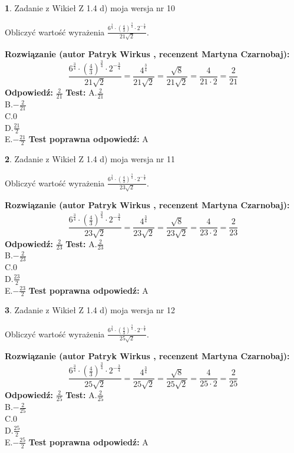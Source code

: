 \documentclass[12pt, a4paper]{article}
\theoremstyle{definition} %
\newtheorem{zad}{}
\newcommand{\zadStart}[1]{\begin{zad}#1\newline}
\newcommand{\zadStop}{\end{zad}}
\newcommand{\rozwStart}[2]{\noindent \textbf{Rozwiązanie (autor #1 , recenzent #2): }\newline}
\newcommand{\rozwStop}{\newline}
\newcommand{\odpStart}{\noindent \textbf{Odpowiedź:}\newline}
\newcommand{\odpStop}{\newline}
\newcommand{\testStart}{\noindent \textbf{Test:}\newline}
\newcommand{\testStop}{\newline}
\newcommand{\kluczStart}{\noindent \textbf{Test poprawna odpowiedź:}\newline}
\newcommand{\kluczStop}{\newline}
\begin{document}
\zadStart{Zadanie z Wikieł Z 1.4 d) moja wersja nr 10}

Obliczyć wartość wyrażenia $\frac{6^{\frac{3}{4}}\cdot (\frac{4}{3})^{\frac{3}{4}}\cdot 2^{-\frac{3}{4}}}{21\sqrt{2}}$.
\zadStop
\rozwStart{Patryk Wirkus}{Martyna Czarnobaj}
$$\frac{6^{\frac{3}{4}}\cdot (\frac{4}{3})^{\frac{3}{4}}\cdot 2^{-\frac{3}{4}}}{21\sqrt{2}} = \frac{4^{\frac{3}{4}}}{21\sqrt{2}} = \frac{\sqrt{8}}{21\sqrt{2}} = \frac{4}{21\cdot 2} = \frac{2}{21}$$
\rozwStop
\odpStart
$\frac{2}{21}$
\odpStop
\testStart
A.$\frac{2}{21}$\\ B.$-\frac{2}{21}$\\ C.$0$\\ D.$\frac{21}{2}$\\ E.$-\frac{21}{2}$
\testStop
\kluczStart
A
\kluczStop



\zadStart{Zadanie z Wikieł Z 1.4 d) moja wersja nr 11}

Obliczyć wartość wyrażenia $\frac{6^{\frac{3}{4}}\cdot (\frac{4}{3})^{\frac{3}{4}}\cdot 2^{-\frac{3}{4}}}{23\sqrt{2}}$.
\zadStop
\rozwStart{Patryk Wirkus}{Martyna Czarnobaj}
$$\frac{6^{\frac{3}{4}}\cdot (\frac{4}{3})^{\frac{3}{4}}\cdot 2^{-\frac{3}{4}}}{23\sqrt{2}} = \frac{4^{\frac{3}{4}}}{23\sqrt{2}} = \frac{\sqrt{8}}{23\sqrt{2}} = \frac{4}{23\cdot 2} = \frac{2}{23}$$
\rozwStop
\odpStart
$\frac{2}{23}$
\odpStop
\testStart
A.$\frac{2}{23}$\\ B.$-\frac{2}{23}$\\ C.$0$\\ D.$\frac{23}{2}$\\ E.$-\frac{23}{2}$
\testStop
\kluczStart
A
\kluczStop



\zadStart{Zadanie z Wikieł Z 1.4 d) moja wersja nr 12}

Obliczyć wartość wyrażenia $\frac{6^{\frac{3}{4}}\cdot (\frac{4}{3})^{\frac{3}{4}}\cdot 2^{-\frac{3}{4}}}{25\sqrt{2}}$.
\zadStop
\rozwStart{Patryk Wirkus}{Martyna Czarnobaj}
$$\frac{6^{\frac{3}{4}}\cdot (\frac{4}{3})^{\frac{3}{4}}\cdot 2^{-\frac{3}{4}}}{25\sqrt{2}} = \frac{4^{\frac{3}{4}}}{25\sqrt{2}} = \frac{\sqrt{8}}{25\sqrt{2}} = \frac{4}{25\cdot 2} = \frac{2}{25}$$
\rozwStop
\odpStart
$\frac{2}{25}$
\odpStop
\testStart
A.$\frac{2}{25}$\\ B.$-\frac{2}{25}$\\ C.$0$\\ D.$\frac{25}{2}$\\ E.$-\frac{25}{2}$
\testStop
\kluczStart
A
\kluczStop
\end{document}
